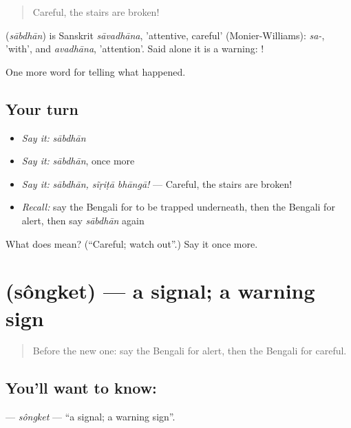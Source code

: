 \begin{quote}
Careful, the stairs are broken!
\end{quote}

\begin{cousinweb}
\textbf{} (\emph{sābdhān}) is Sanskrit \emph{sāvadhāna}, 'attentive, careful' (Monier-Williams): \emph{sa-}, 'with', and \emph{avadhāna}, 'attention'. Said alone it is a warning: !
\end{cousinweb}

\begin{grammarlens}[title={What you've built}]
One more word for telling what happened.
\end{grammarlens}

\subsection*{Your turn}
\begin{itemize}
\raggedright
  \item \emph{Say it:} \emph{sābdhān}
  \item \emph{Say it:} \emph{sābdhān}, once more
  \item \emph{Say it:} \emph{sābdhān, sĩṛiṭā bhāngā!} — Careful, the stairs are broken!
  \item \emph{Recall:} say the Bengali for to be trapped underneath, then the Bengali for alert, then say \emph{sābdhān} again
\end{itemize}

\begin{tcolorbox}[breakable,colback=teal!4,colframe=teal!35!black,title={Before you move on}]
What does  mean? (\textquotedblleft{}Careful; watch out\textquotedblright{}.) Say it once more.
\end{tcolorbox}
\section[\texorpdfstring{\bn{সংকেত} (sôngket)}{সংকেত (sôngket)}]{ (sôngket) — a signal; a warning sign}

\label{lesson:BN-C294-songket}



\begin{quote}
Before the new one: say the Bengali for alert, then the Bengali for careful.
\end{quote}

\subsection*{You'll want to know: }
\textbf{} — \emph{sôngket} — \textquotedblleft{}a signal; a warning sign\textquotedblright{}.

